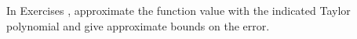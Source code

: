 {\noindent In Exercises}
{, approximate the function value with the indicated Taylor polynomial and give approximate bounds on the error.
}
